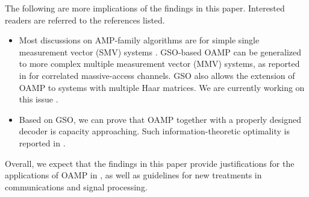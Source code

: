 \documentclass[journal]{IEEEtran}
\newcommand{\LL}[1]{\textcolor{black}{#1}}
\begin{document}
{ The following are more implications of the findings in this paper. Interested readers are referred to the references listed.
\begin{itemize}
    \item Most discussions on AMP-family algorithms are for simple single measurement vector (SMV) systems \cite{Donoho2009, Cakmak2018, Minka2001, Rangan2016, Bayati2011, Ma2016, Takeuchi2017, Dudeja2022, LiuAMP2019, MaLiu2018}. GSO-based OAMP can be generalized to more complex multiple measurement vector (MMV) systems, as reported in \cite{Yiyao_mmv} for correlated massive-access channels. GSO also allows the extension of OAMP to systems with multiple Haar matrices. We are currently working on this issue \cite{Lei_TSP_2_2019}.
\item Based on GSO, we can prove that OAMP together with a properly designed decoder is capacity approaching. Such information-theoretic optimality is reported in \cite{OAMP_ISIT22, OAMP_TCOM}.
 \end{itemize}
 
Overall, we expect that the findings in this paper provide justifications for the applications of OAMP in \cite{He2018AI, Zhang2019AI,  Takabe2019, OAMP_ISIT22, OAMP_TCOM, Yiyao_integral, Lei_TSP_2_2019, KhaniANSD2020, IC-SRC2021, Yiyao_ofdm, HWang2019, XZhou2022, ZhangOAMP2017, SLiu2022, LiOTFS2022,Yiyao_mmv, Fletcher2016},   as well as guidelines for new treatments in communications and signal processing.}










\end{document}
